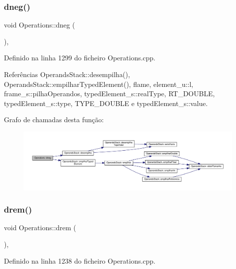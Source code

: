 \subsubsection{\texorpdfstring{dneg()}{dneg()}}
{\footnotesize\ttfamily void Operations\+::dneg (\begin{DoxyParamCaption}{ }\end{DoxyParamCaption})\hspace{0.3cm}{\ttfamily [static]}, {\ttfamily [private]}}



Definido na linha 1299 do ficheiro Operations.\+cpp.



Referências Operands\+Stack\+::desempilha(), Operands\+Stack\+::empilhar\+Typed\+Element(), flame, element\+\_\+u\+::l, frame\+\_\+s\+::pilha\+Operandos, typed\+Element\+\_\+s\+::real\+Type, R\+T\+\_\+\+D\+O\+U\+B\+LE, typed\+Element\+\_\+s\+::type, T\+Y\+P\+E\+\_\+\+D\+O\+U\+B\+LE e typed\+Element\+\_\+s\+::value.

Grafo de chamadas desta função\+:
\nopagebreak
\begin{figure}[H]
\begin{center}
\leavevmode
\includegraphics[width=350pt]{classOperations_a04f5d4f85b80f4c04216cd0259d3d7dc_cgraph}
\end{center}
\end{figure}
\mbox{\label{classOperations_abe333415749dbd2331ce89dc5e2233c5}} 
\subsubsection{\texorpdfstring{drem()}{drem()}}
{\footnotesize\ttfamily void Operations\+::drem (\begin{DoxyParamCaption}{ }\end{DoxyParamCaption})\hspace{0.3cm}{\ttfamily [static]}, {\ttfamily [private]}}



Definido na linha 1238 do ficheiro Operations.\+cpp.



